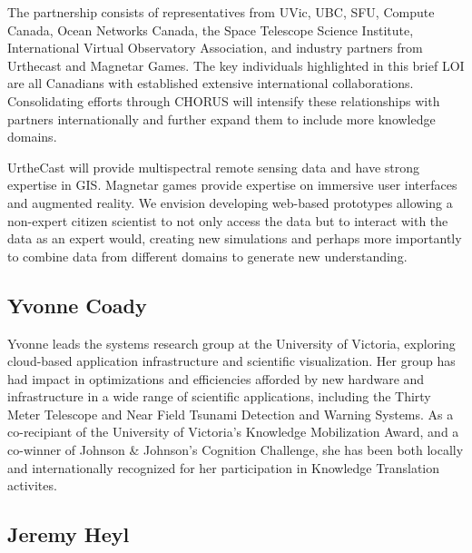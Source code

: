 

The partnership consists of representatives from UVic, UBC, SFU,
Compute Canada, Ocean Networks Canada, the Space Telescope Science
Institute, International Virtual Observatory Association, and industry
partners from Urthecast and Magnetar Games.  The key individuals
highlighted in this brief LOI are all Canadians with established
extensive international collaborations.  Consolidating efforts through
CHORUS will intensify these relationships with partners
internationally and further expand them to include more knowledge
domains.

UrtheCast will provide multispectral remote sensing data and have
strong expertise in GIS.  Magnetar games provide expertise on
immersive user interfaces and augmented reality.  We envision
developing web-based prototypes allowing a non-expert citizen
scientist to not only access the data but to interact with the data as
an expert would, creating new simulations and perhaps more importantly
to combine data from different domains to generate new understanding.

\subsection*{Yvonne Coady} 

Yvonne leads the systems research group at the University of Victoria,
exploring cloud-based application infrastructure and scientific
visualization.  Her group has had impact in optimizations and
efficiencies afforded by new hardware and infrastructure in a wide
range of scientific applications, including the Thirty Meter Telescope
and Near Field Tsunami Detection and Warning Systems.  As a
co-recipiant of the University of Victoria's Knowledge Mobilization
Award, and a co-winner of Johnson \& Johnson's Cognition Challenge, she
has been both locally and internationally recognized for her
participation in Knowledge Translation activites.


\subsection*{Jeremy Heyl}

